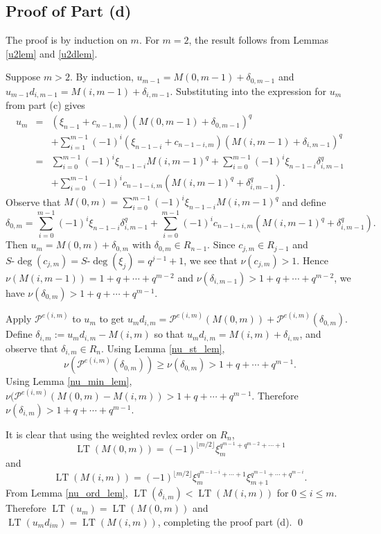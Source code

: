 \documentclass{amsart}
\newcommand{\PP}{\mathcal{P}}
\DeclareMathOperator{\lt}{LT}
\newcommand{\wdeg}{{S\mbox{-}\deg}}
\begin{document}
\subsection{Proof of Part (d)}
The proof is by induction on $m$. For $m=2$, the result follows from  Lemmas \ref{u2lem} and \ref{u2dlem}.

Suppose $m>2$.
By induction, $u_{m-1}=M(0,m-1)+\delta_{0,m-1}$ and $u_{m-1}d_{i,m-1}=M(i,m-1)+\delta_{i,m-1}$.
Substituting into the expression for $u_m$ from part (c) gives
\begin{eqnarray*}
u_m&=&(\xi_{n-1}+c_{n-1,m})(M(0,m-1)+\delta_{0,m-1})^q\\
     &&+\sum_{i=1}^{m-1}(-1)^i(\xi_{n-1-i}+c_{n-1-i,m})(M(i,m-1)+\delta_{i,m-1})^q\\
     &=&\sum_{i=0}^{m-1}(-1)^i\xi_{n-1-i}M(i,m-1)^q+\sum_{i=0}^{m-1}(-1)^i\xi_{n-1-i}\delta_{i,m-1}^q\\
     &&+\sum_{i=0}^{m-1}(-1)^ic_{n-1-i,m}(M(i,m-1)^q+\delta_{i,m-1}^q).
\end{eqnarray*}     
Observe that $M(0,m)=\sum_{i=0}^{m-1}(-1)^i\xi_{n-1-i}M(i,m-1)^q$ and define
$$\delta_{0,m}=\sum_{i=0}^{m-1}(-1)^i\xi_{n-1-i}\delta_{i,m-1}^q
     +\sum_{i=0}^{m-1}(-1)^ic_{n-1-i,m}(M(i,m-1)^q+\delta_{i,m-1}^q).$$
Then $u_m=M(0,m)+\delta_{0,m}$ with $\delta_{0,m}\in R_{n-1}$.  
Since $c_{j,m}\in R_{j-1}$ and $\wdeg(c_{j,m})=\wdeg(\xi_{j})=q^{j-1}+1$, 
we see that $\nu(c_{j,m})>1$.
Hence $\nu(M(i,m-1))=1+q+\cdots+q^{m-2}$ and $\nu(\delta_{i,m-1})>1+q+\cdots+q^{m-2}$,
we have $\nu(\delta_{0,m})>1+q+\cdots+q^{m-1}$.

Apply $\PP^{e(i,m)}$ to $u_m$ to get 
$u_md_{i,m}=\PP^{e(i,m)}(M(0,m))+\PP^{e(i,m)}(\delta_{0,m})$.
Define $\delta_{i,m}:=u_m d_{i,m}-M(i,m)$ so that $u_m d_{i,m}=M(i,m)+\delta_{i,m}$, and observe that $\delta_{i,m}\in R_{n}$.
Using Lemma \ref{nu_st_lem}, $$\nu(\PP^{e(i,m)}(\delta_{0,m}))\geq \nu(\delta_{0,m})>1+q+\cdots+q^{m-1}.$$
Using Lemma \ref{nu_min_lem}, $\nu(\PP^{e(i,m)}(M(0,m)-M(i,m))>1+q+\cdots+q^{m-1}$.
Therefore $\nu(\delta_{i,m})>1+q+\cdots +q^{m-1}$.

It is clear that using the weighted revlex order on $R_{n}$, 
$$\lt(M(0,m))=(-1)^{\lfloor m/2 \rfloor}\xi_{m}^{q^{m-1}+q^{m-2}+\cdots+1}$$ and 
$$\lt(M(i,m))=(-1)^{\lfloor m/2 \rfloor}\xi_{m}^{q^{m-1-i}+\cdots+1}\xi_{m+1}^{q^{m-1}+\cdots+q^{m-i}}.$$
From Lemma \ref{nu_ord_lem}, $\lt(\delta_{i,m})<\lt(M(i,m))$ for $0\leq i\leq m$. 
Therefore $\lt(u_m)=\lt(M(0,m))$ and $\lt(u_m d_{i m})=\lt(M(i,m))$, completing the proof part (d).  \qed
\end{document}
